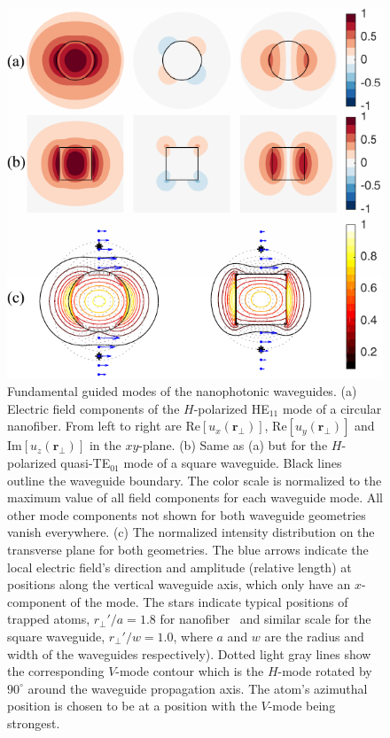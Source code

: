 \documentclass[aps,pra,twocolumn,superscriptaddress]{revtex4-1} %
\def\br{\mathbf{r}}
\newcommand{\SWG}{square waveguide\xspace}%
\begin{document}
\begin{figure}[htb]
\centering
  \includegraphics[width=.49\textwidth]{fig/nanofiberswg_Hmode6}
  \caption{Fundamental guided modes of the nanophotonic waveguides. (a) Electric field components of the $H$-polarized HE$_{11}$ mode of a circular nanofiber. From left to right are $ \mathrm{Re}[u_x(\br\!_\perp)] $, $ \mathrm{Re}[u_y(\br\!_\perp)] $ and $ \mathrm{Im}[u_z(\br\!_\perp)] $ in the $ xy $-plane. (b) Same as (a) but for  the $H$-polarized quasi-TE$_{01}$ mode of a square waveguide. Black lines outline the waveguide boundary. The color scale is normalized to the maximum value of all field components for each waveguide mode. All other mode components not shown for both waveguide geometries vanish everywhere. (c) The normalized intensity distribution on the transverse plane for both geometries. The blue arrows indicate the local electric field's direction and amplitude (relative length) at positions along the vertical waveguide axis, which only have an $ x $-component of the mode. The stars indicate typical positions of trapped atoms, $r_\perp'/a=1.8  $ for nanofiber~\cite{Vetsch2010Optical} and similar scale for the \SWG,  $ r_\perp'/w=1.0 $, where $ a $ and $ w $ are the radius and width of the waveguides respectively). Dotted light gray lines show the corresponding $ V $-mode contour which is the $ H $-mode rotated by $ 90^\circ $ around the waveguide propagation axis. The atom's azimuthal position is chosen to be at a position with the $V$-mode being strongest. }\label{fig:nanofiberSWG_E_ints}
\end{figure}
\end{document}
